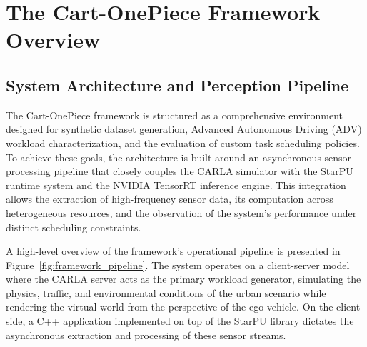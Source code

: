 
\chapter{The Cart-OnePiece Framework Overview} \label{ch:framework}
\vspace{-1.9cm}

\section{System Architecture and Perception Pipeline} \label{sec:system_pipeline}

The Cart-OnePiece framework is structured as a comprehensive environment designed for synthetic dataset generation, Advanced Autonomous Driving (ADV) workload characterization, and the evaluation of custom task scheduling policies. To achieve these goals, the architecture is built around an asynchronous sensor processing pipeline that closely couples the CARLA simulator \cite{Dosovitskiy2017} with the StarPU runtime system and the NVIDIA TensorRT inference engine. This integration allows the extraction of high-frequency sensor data, its computation across heterogeneous resources, and the observation of the system's performance under distinct scheduling constraints.

A high-level overview of the framework's operational pipeline is presented in Figure~\ref{fig:framework_pipeline}. The system operates on a client-server model where the CARLA server acts as the primary workload generator, simulating the physics, traffic, and environmental conditions of the urban scenario while rendering the virtual world from the perspective of the ego-vehicle. On the client side, a C++ application implemented on top of the StarPU library dictates the asynchronous extraction and processing of these sensor streams.

